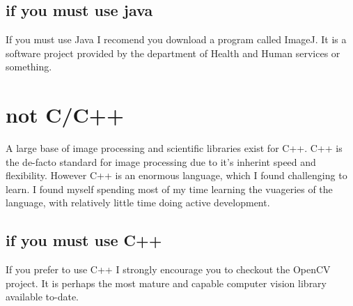 \subsection{if you must use java}
If you must use Java I recomend you download a program called ImageJ. It is a software project provided by the department of Health and Human services or something.

\section{not C/C++}
A large base of image processing and scientific libraries exist for C++.  C++ is the de-facto standard for image processing due to it's inherint speed and flexibility.  However C++ is an enormous language, which I found challenging to learn. I found myself spending most of my time learning the vuageries of the language, with relatively little time doing active development.

\subsection{if you must use C++}
If you prefer to use C++ I strongly encourage you to checkout the OpenCV project. It is perhaps the most mature and capable computer vision library  available to-date.

\newpage
